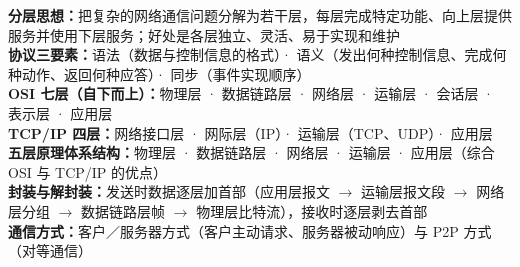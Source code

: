 \documentclass[a4paper,11pt]{article}
\begin{document}

\begin{knowmap}
\textbf{分层思想：}把复杂的网络通信问题分解为若干层，每层完成特定功能、向上层提供服务并使用下层服务；好处是各层独立、灵活、易于实现和维护\\[2pt]
\textbf{协议三要素：}语法（数据与控制信息的格式）· 语义（发出何种控制信息、完成何种动作、返回何种应答）· 同步（事件实现顺序）\\[2pt]
\textbf{OSI 七层（自下而上）：}物理层 · 数据链路层 · 网络层 · 运输层 · 会话层 · 表示层 · 应用层\\[2pt]
\textbf{TCP/IP 四层：}网络接口层 · 网际层（IP）· 运输层（TCP、UDP）· 应用层\\[2pt]
\textbf{五层原理体系结构：}物理层 · 数据链路层 · 网络层 · 运输层 · 应用层（综合 OSI 与 TCP/IP 的优点）\\[2pt]
\textbf{封装与解封装：}发送时数据逐层加首部（应用层报文 $\rightarrow$ 运输层报文段 $\rightarrow$ 网络层分组 $\rightarrow$ 数据链路层帧 $\rightarrow$ 物理层比特流），接收时逐层剥去首部\\[2pt]
\textbf{通信方式：}客户／服务器方式（客户主动请求、服务器被动响应）与 P2P 方式（对等通信）
\end{knowmap}
\end{document}

